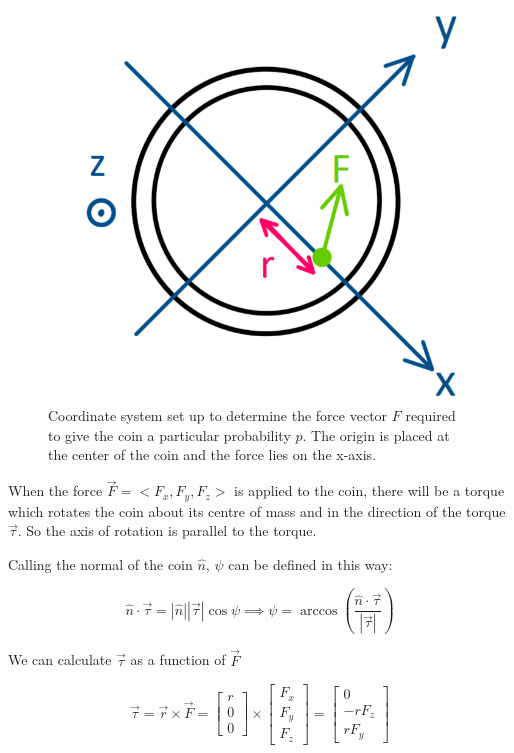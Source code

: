 \documentclass[english,12pt,a4paper,final]{article}
\begin{document}
\begin{figure}[H]
	\centering
	\includegraphics[width=0.7\linewidth]{coinCoords}
	\caption{Coordinate system set up to determine the force vector $F$ required to give the coin a particular probability $p$. The origin is placed at the center of the coin and the force lies on the x-axis.}
	\label{fig:coincoords}
\end{figure}

When the force $\vec{F}=<F_x, F_y, F_z>$ is applied to the coin, there will be a torque which rotates the coin about its centre of mass and in the direction of the torque $\vec{\tau}$. So the axis of rotation is parallel to the torque.

Calling the normal of the coin $\hat{n}$, $\psi$ can be defined in this way:

\begin{equation*}
	\hat{n} \cdot \vec{\tau} = |\hat{n}| |\vec{\tau}| \cos\psi \implies \psi = \arccos\left(\frac{\hat{n}\cdot\vec{\tau}}{|\vec{\tau}|}\right)
\end{equation*}

We can calculate $\vec{\tau}$ as a function of $\vec{F}$

\begin{equation*}
	\vec{\tau} = \vec{r}\times\vec{F} = \begin{bmatrix}r\\0\\0\end{bmatrix} \times \begin{bmatrix}F_x \\ F_y \\ F_z\end{bmatrix} = \begin{bmatrix}0\\-r F_z\\r F_y\end{bmatrix}
\end{equation*}
\end{document}
